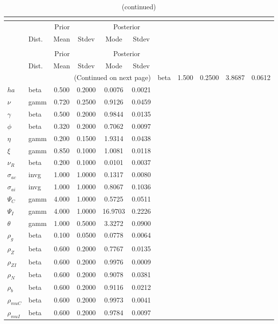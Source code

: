  
\begin{center}
\begin{longtable}{llcccc} 
\caption{Results from posterior maximization (parameters)}\\
 \label{Table:Posterior:1}\\
\toprule 
  & \multicolumn{3}{c}{Prior}  &  \multicolumn{2}{c}{Posterior} \\
  \cmidrule(r{.75em}){2-4} \cmidrule(r{.75em}){5-6}
  & Dist. & Mean  & Stdev & Mode & Stdev \\ 
\midrule \endfirsthead 
\caption{(continued)}\\
 \bottomrule 
  & \multicolumn{3}{c}{Prior}  &  \multicolumn{2}{c}{Posterior} \\
  \cmidrule(r{.75em}){2-4} \cmidrule(r{.75em}){5-6}
  & Dist. & Mean  & Stdev & Mode & Stdev \\ 
\midrule \endhead 
\bottomrule \multicolumn{6}{r}{(Continued on next page)}\endfoot 
\bottomrule\endlastfoot 
${\sigma}$ & beta &   1.500 & 0.2500 &   3.8687 &  0.0612 \\ 
${ha}$ & beta &   0.500 & 0.2000 &   0.0076 &  0.0021 \\ 
$\nu$ & gamm &   0.720 & 0.2500 &   0.9126 &  0.0459 \\ 
$\gamma$ & beta &   0.500 & 0.2000 &   0.9844 &  0.0135 \\ 
${\phi}$ & beta &   0.320 & 0.2000 &   0.7062 &  0.0097 \\ 
${\eta}$ & gamm &   0.200 & 0.1500 &   1.9314 &  0.0438 \\ 
$\xi$ & gamm &   0.850 & 0.1000 &   1.0081 &  0.0118 \\ 
${\nu_R}$ & beta &   0.200 & 0.1000 &   0.0101 &  0.0037 \\ 
${\sigma_{ac}}$ & invg &   1.000 & 1.0000 &   0.1317 &  0.0080 \\ 
${\sigma_{ai}}$ & invg &   1.000 & 1.0000 &   0.8067 &  0.1036 \\ 
${\Psi_{C}}$ & gamm &   4.000 & 1.0000 &   0.5725 &  0.0511 \\ 
${\Psi_I}$ & gamm &   4.000 & 1.0000 &  16.9703 &  0.2226 \\ 
${\theta}$ & gamm &   1.000 & 0.5000 &   3.3272 &  0.0900 \\ 
${\rho_g}$ & beta &   0.100 & 0.0500 &   0.0778 &  0.0064 \\ 
${\rho_Z}$ & beta &   0.600 & 0.2000 &   0.7767 &  0.0135 \\ 
${\rho_{ZI}}$ & beta &   0.600 & 0.2000 &   0.9976 &  0.0009 \\ 
${\rho_N}$ & beta &   0.600 & 0.2000 &   0.9078 &  0.0381 \\ 
${\rho_b}$ & beta &   0.600 & 0.2000 &   0.9116 &  0.0212 \\ 
${\rho_{muC}}$ & beta &   0.600 & 0.2000 &   0.9973 &  0.0041 \\ 
${\rho_{muI}}$ & beta &   0.600 & 0.2000 &   0.9784 &  0.0097 \\ 
\end{longtable}
 \end{center}
